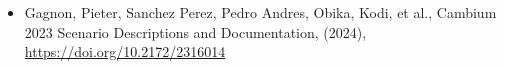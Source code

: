 \begin{itemize}
\item Gagnon, Pieter, Sanchez Perez, Pedro Andres, Obika, Kodi, et al., Cambium 2023 Scenario Descriptions and Documentation, (2024), \href{https://doi.org/10.2172/2316014f}{https://doi.org/10.2172/2316014}
\end{itemize}
